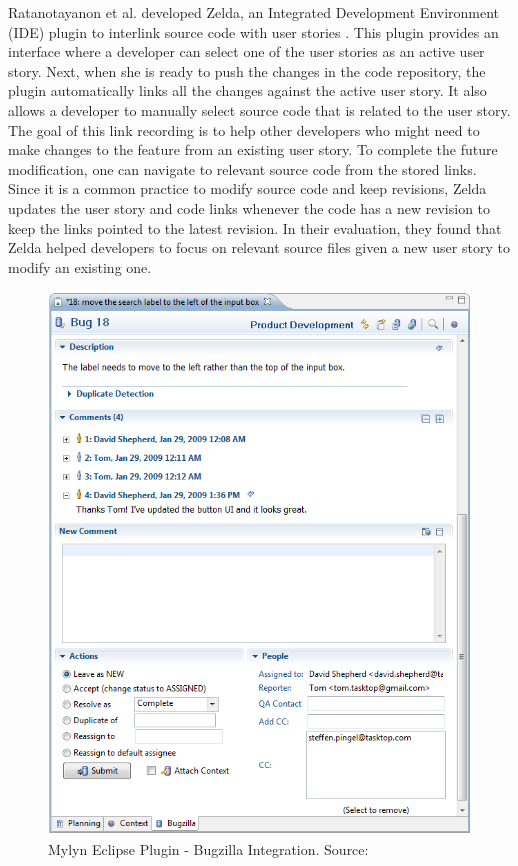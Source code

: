 Ratanotayanon et al. developed Zelda, an Integrated Development Environment (IDE) plugin to interlink source code with user stories \cite{supporting_program}. This plugin provides an interface where a developer can select one of the user stories as an active user story. Next, when she is ready to push the changes in the code repository, the plugin automatically links all the changes against the active user story. It also allows a developer to manually select source code that is related to the user story. The goal of this link recording is to help other developers who might need to make changes to the feature from an existing user story. To complete the future modification, one can navigate to relevant source code from the stored links. Since it is a common practice to modify source code and keep revisions, Zelda updates the user story and code links whenever the code has a new revision to keep the links pointed to the latest revision. In their evaluation, they found that Zelda helped developers to focus on relevant source files given a new user story to modify an existing one.

\afterpage{\clearpage}
\begin{figure}[!htb]
	\centering
	\includegraphics[width=\textwidth]{Mylyn-comment.png}
    \caption{Mylyn Eclipse Plugin - Bugzilla Integration. Source: \cite{mylyn}}
	\label{fig:mylyn-comment}
\end{figure}

